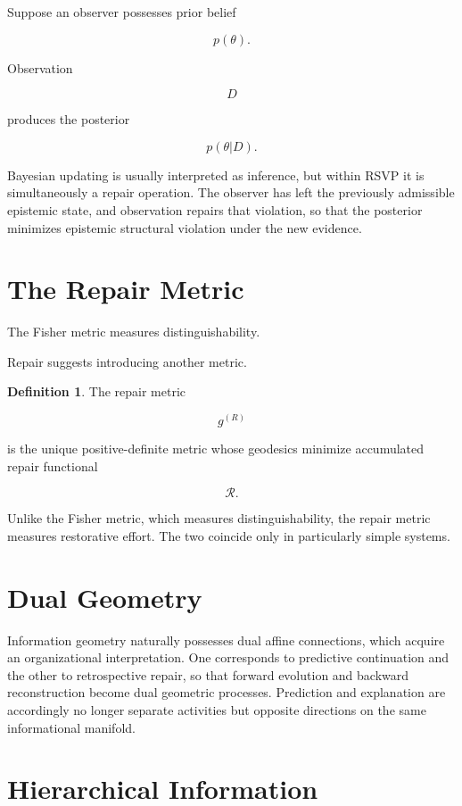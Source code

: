 \documentclass[11pt,oneside]{book}
\numberwithin{equation}{chapter}
\theoremstyle{definition}
\newtheorem{definition}{Definition}[chapter]
\theoremstyle{plain}
\begin{document}
Suppose an observer possesses prior belief

\[
p(\theta).
\]

Observation

\[
D
\]

produces the posterior

\[
p(\theta|D).
\]

Bayesian updating is usually interpreted as inference, but within RSVP it is simultaneously a repair operation. The observer has left the previously admissible epistemic state, and observation repairs that violation, so that the posterior minimizes epistemic structural violation under the new evidence.

\section{The Repair Metric}

The Fisher metric measures distinguishability.

Repair suggests introducing another metric.

\begin{definition}

The repair metric

\[
g^{(R)}
\]

is the unique positive-definite metric whose geodesics minimize accumulated
repair functional

\[
\mathcal R.
\]

\end{definition}

Unlike the Fisher metric, which measures distinguishability, the repair metric measures restorative effort. The two coincide only in particularly simple systems.

\section{Dual Geometry}

Information geometry naturally possesses dual affine connections, which acquire an organizational interpretation. One corresponds to predictive continuation and the other to retrospective repair, so that forward evolution and backward reconstruction become dual geometric processes. Prediction and explanation are accordingly no longer separate activities but opposite directions on the same informational manifold.

\section{Hierarchical Information}
\end{document}
